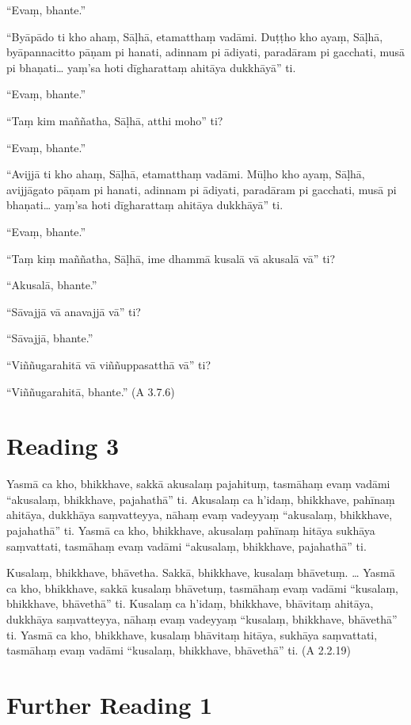 “Evaṃ, bhante.”

“Byāpādo ti kho ahaṃ, Sāḷhā, etamatthaṃ vadāmi. Duṭṭho kho ayaṃ, Sāḷhā, byāpannacitto pāṇam pi hanati, adinnam pi ādiyati, paradāram pi gacchati, musā pi bhaṇati… yaṃ’sa hoti dīgharattaṃ ahitāya dukkhāyā” ti.

“Evaṃ, bhante.”

“Taṃ kim maññatha, Sāḷhā, atthi moho” ti?

“Evaṃ, bhante.”

“Avijjā ti kho ahaṃ, Sāḷhā, etamatthaṃ vadāmi. Mūḷho kho ayaṃ, Sāḷhā, avijjāgato pāṇam pi hanati, adinnam pi ādiyati, paradāram pi gacchati, musā pi bhaṇati… yaṃ’sa hoti dīgharattaṃ ahitāya dukkhāyā” ti.

“Evaṃ, bhante.”

“Taṃ kiṃ maññatha, Sāḷhā, ime dhammā kusalā vā akusalā vā” ti?

“Akusalā, bhante.”

“Sāvajjā vā anavajjā vā” ti?

“Sāvajjā, bhante.”

“Viññugarahitā vā viññuppasatthā vā” ti?

“Viññugarahitā, bhante.” \hfill(A 3.7.6)

\section*{Reading 3}

Yasmā ca kho, bhikkhave, sakkā akusalaṃ pajahituṃ, tasmāhaṃ evaṃ vadāmi “akusalaṃ, bhikkhave, pajahathā” ti. Akusalaṃ ca h’idaṃ, bhikkhave, pahīnaṃ ahitāya, dukkhāya saṃvatteyya, nāhaṃ evaṃ vadeyyaṃ “akusalaṃ, bhikkhave, pajahathā” ti. Yasmā ca kho, bhikkhave, akusalaṃ pahīnaṃ hitāya sukhāya saṃvattati, tasmāhaṃ evaṃ vadāmi “akusalaṃ, bhikkhave, pajahathā” ti.

Kusalaṃ, bhikkhave, bhāvetha. Sakkā, bhikkhave, kusalaṃ bhāvetuṃ. … Yasmā ca kho, bhikkhave, sakkā kusalaṃ bhāvetuṃ, tasmāhaṃ evaṃ vadāmi “kusalaṃ, bhikkhave, bhāvethā” ti. Kusalaṃ ca h’idaṃ, bhikkhave, bhāvitaṃ ahitāya, dukkhāya saṃvatteyya, nāhaṃ evaṃ vadeyyaṃ “kusalaṃ, bhikkhave, bhāvethā” ti. Yasmā ca kho, bhikkhave, kusalaṃ bhāvitaṃ hitāya, sukhāya saṃvattati, tasmāhaṃ evaṃ vadāmi “kusalaṃ, bhikkhave, bhāvethā” ti. \hfill(A 2.2.19)

\section*{Further Reading 1}

